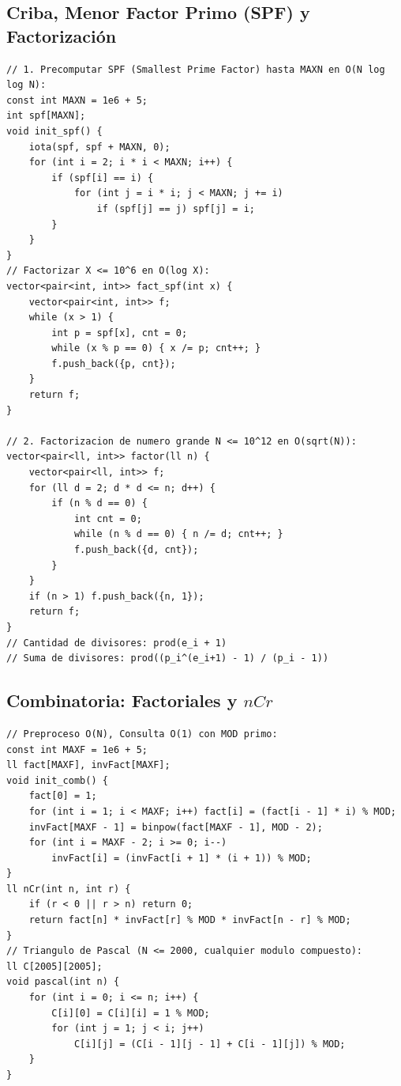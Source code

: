 \documentclass[9pt,twocolumn,a4paper]{extarticle}
\begin{document}
\subsection{Criba, Menor Factor Primo (SPF) y Factorización}
\begin{lstlisting}
// 1. Precomputar SPF (Smallest Prime Factor) hasta MAXN en O(N log log N):
const int MAXN = 1e6 + 5;
int spf[MAXN];
void init_spf() {
    iota(spf, spf + MAXN, 0);
    for (int i = 2; i * i < MAXN; i++) {
        if (spf[i] == i) {
            for (int j = i * i; j < MAXN; j += i)
                if (spf[j] == j) spf[j] = i;
        }
    }
}
// Factorizar X <= 10^6 en O(log X):
vector<pair<int, int>> fact_spf(int x) {
    vector<pair<int, int>> f;
    while (x > 1) {
        int p = spf[x], cnt = 0;
        while (x % p == 0) { x /= p; cnt++; }
        f.push_back({p, cnt});
    }
    return f;
}

// 2. Factorizacion de numero grande N <= 10^12 en O(sqrt(N)):
vector<pair<ll, int>> factor(ll n) {
    vector<pair<ll, int>> f;
    for (ll d = 2; d * d <= n; d++) {
        if (n % d == 0) {
            int cnt = 0;
            while (n % d == 0) { n /= d; cnt++; }
            f.push_back({d, cnt});
        }
    }
    if (n > 1) f.push_back({n, 1});
    return f;
}
// Cantidad de divisores: prod(e_i + 1)
// Suma de divisores: prod((p_i^(e_i+1) - 1) / (p_i - 1))
\end{lstlisting}

\subsection{Combinatoria: Factoriales y $nCr$}
\begin{lstlisting}
// Preproceso O(N), Consulta O(1) con MOD primo:
const int MAXF = 1e6 + 5;
ll fact[MAXF], invFact[MAXF];
void init_comb() {
    fact[0] = 1;
    for (int i = 1; i < MAXF; i++) fact[i] = (fact[i - 1] * i) % MOD;
    invFact[MAXF - 1] = binpow(fact[MAXF - 1], MOD - 2);
    for (int i = MAXF - 2; i >= 0; i--)
        invFact[i] = (invFact[i + 1] * (i + 1)) % MOD;
}
ll nCr(int n, int r) {
    if (r < 0 || r > n) return 0;
    return fact[n] * invFact[r] % MOD * invFact[n - r] % MOD;
}
// Triangulo de Pascal (N <= 2000, cualquier modulo compuesto):
ll C[2005][2005];
void pascal(int n) {
    for (int i = 0; i <= n; i++) {
        C[i][0] = C[i][i] = 1 % MOD;
        for (int j = 1; j < i; j++)
            C[i][j] = (C[i - 1][j - 1] + C[i - 1][j]) % MOD;
    }
}
\end{lstlisting}
\end{document}
